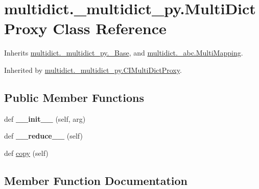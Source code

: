 \hypertarget{classmultidict_1_1__multidict__py_1_1_multi_dict_proxy}{}\section{multidict.\+\_\+multidict\+\_\+py.\+Multi\+Dict\+Proxy Class Reference}
\label{classmultidict_1_1__multidict__py_1_1_multi_dict_proxy}


Inherits \hyperlink{classmultidict_1_1__multidict__py_1_1___base}{multidict.\+\_\+multidict\+\_\+py.\+\_\+\+Base}, and \hyperlink{classmultidict_1_1__abc_1_1_multi_mapping}{multidict.\+\_\+abc.\+Multi\+Mapping}.



Inherited by \hyperlink{classmultidict_1_1__multidict__py_1_1_c_i_multi_dict_proxy}{multidict.\+\_\+multidict\+\_\+py.\+C\+I\+Multi\+Dict\+Proxy}.

\subsection*{Public Member Functions}
\begin{DoxyCompactItemize}
\item 
\mbox{\label{classmultidict_1_1__multidict__py_1_1_multi_dict_proxy_a055804411bb7c83917a78ba18ec4f9ff}} 
def {\bfseries \+\_\+\+\_\+init\+\_\+\+\_\+} (self, arg)
\item 
\mbox{\label{classmultidict_1_1__multidict__py_1_1_multi_dict_proxy_ac29f55b599ec4a09acffd18f5a75fe1b}} 
def {\bfseries \+\_\+\+\_\+reduce\+\_\+\+\_\+} (self)
\item 
def \hyperlink{classmultidict_1_1__multidict__py_1_1_multi_dict_proxy_ab6fbdbe6ee53c96ce7cb7d1e9bba2b6b}{copy} (self)
\end{DoxyCompactItemize}


\subsection{Member Function Documentation}
\mbox{\label{classmultidict_1_1__multidict__py_1_1_multi_dict_proxy_ab6fbdbe6ee53c96ce7cb7d1e9bba2b6b}} 
